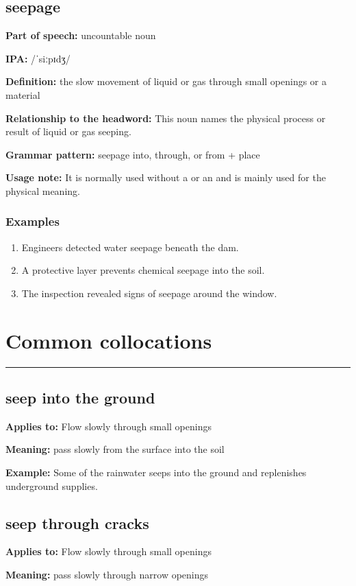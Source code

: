 \documentclass[11pt]{article}
\newcommand{\sectionrule}{\par\vspace{-0.5em}\noindent\textcolor{Accent}{\rule{\linewidth}{0.6pt}}\par}
\begin{document}
\subsection{seepage}
\textbf{Part of speech:} uncountable noun

\textbf{IPA:} /ˈsiːpɪdʒ/

\textbf{Definition:} the slow movement of liquid or gas through small openings or a material

\textbf{Relationship to the headword:} This noun names the physical process or result of liquid or gas seeping.

\textbf{Grammar pattern:} seepage into, through, or from + place

\textbf{Usage note:} It is normally used without a or an and is mainly used for the physical meaning.

\subsubsection{Examples}
\begin{enumerate}
  \item Engineers detected water seepage beneath the dam.
  \item A protective layer prevents chemical seepage into the soil.
  \item The inspection revealed signs of seepage around the window.
\end{enumerate}

\section{Common collocations}
\sectionrule
\subsection{seep into the ground}
\textbf{Applies to:} Flow slowly through small openings

\textbf{Meaning:} pass slowly from the surface into the soil

\textbf{Example:} Some of the rainwater seeps into the ground and replenishes underground supplies.

\subsection{seep through cracks}
\textbf{Applies to:} Flow slowly through small openings

\textbf{Meaning:} pass slowly through narrow openings
\end{document}
